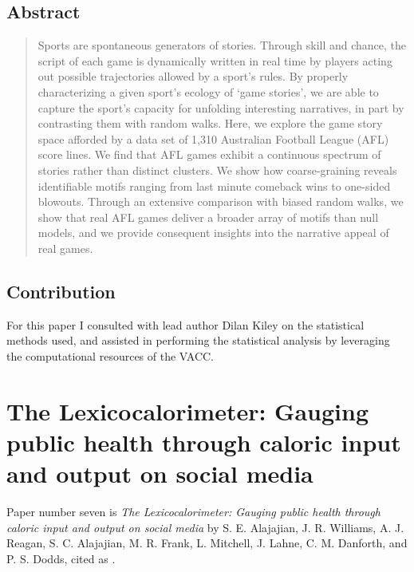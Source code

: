 \subsection{Abstract}
\begin{quote}
  Sports are spontaneous generators of stories.
Through skill and chance, the script of each game is dynamically written in real time by players acting out possible trajectories allowed by a sport's rules.
By properly characterizing a given sport's ecology of `game stories',
we are able to capture the sport's capacity for unfolding interesting narratives,
in part by contrasting them with random walks.
Here, we explore the game story space afforded by a data set of 1,310 Australian Football League (AFL) score lines.
We find that AFL games exhibit a continuous spectrum of stories rather than distinct clusters.
We show how coarse-graining reveals identifiable motifs ranging from last minute comeback wins to one-sided blowouts.
Through an extensive comparison with biased random walks,
we show that real AFL games deliver a broader array of motifs than null models,
and we provide consequent insights into the narrative appeal of real games.
\end{quote}

\subsection{Contribution}

For this paper I consulted with lead author Dilan Kiley on the statistical methods used, and assisted in performing the statistical analysis by leveraging the computational resources of the VACC.

\section{The Lexicocalorimeter: Gauging public health through caloric input and output on social media}

Paper number seven is \textit{The Lexicocalorimeter: Gauging public health through caloric input and output on social media} by S. E. Alajajian, J. R. Williams, A. J. Reagan, S. C. Alajajian, M. R. Frank, L. Mitchell, J. Lahne, C. M. Danforth, and P. S. Dodds, cited as \cite{alajajian2015lexicocalorimeter}.

